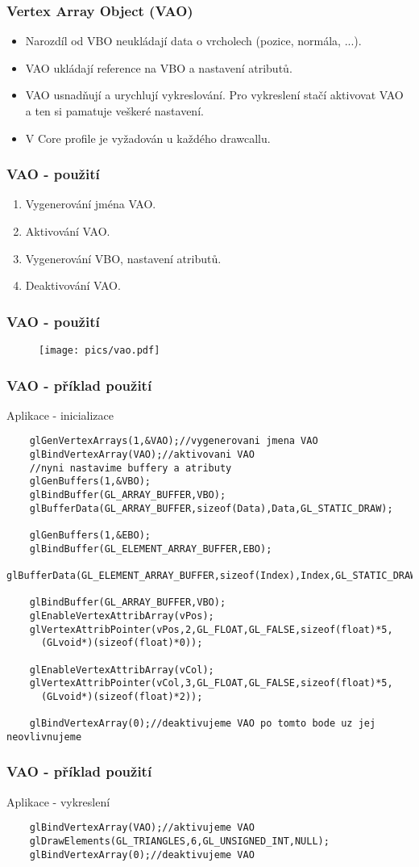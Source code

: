 \begin{frame}[fragile]
\frametitle{Vertex Array Object (VAO)}
	\begin{itemize}
	\item Narozdíl od VBO neukládají data o vrcholech (pozice, normála, ...).
	\item VAO ukládají reference na VBO a nastavení atributů.
	\item VAO usnadňují a urychlují vykreslování.
	Pro vykreslení stačí aktivovat VAO a ten si pamatuje veškeré nastavení.
  \item V Core profile je vyžadován u každého drawcallu.
	\end{itemize}
\end{frame}

\begin{frame}[fragile]
\frametitle{VAO - použití}
	\begin{enumerate}
	\item Vygenerování jména VAO.
	\item Aktivování VAO.
	\item Vygenerování VBO, nastavení atributů.
	\item Deaktivování VAO.
	\end{enumerate}
\end{frame}

\begin{frame}[fragile]
\frametitle{VAO - použití}
  \begin{figure}[h]
  \texttt{[image: pics/vao.pdf]}
  \end{figure}
\end{frame}

\begin{frame}[fragile]
\frametitle{VAO - příklad použití}
	Aplikace - inicializace
	{\scriptsize
	\begin{verbatim}
	glGenVertexArrays(1,&VAO);//vygenerovani jmena VAO
	glBindVertexArray(VAO);//aktivovani VAO
	//nyni nastavime buffery a atributy
	glGenBuffers(1,&VBO);
	glBindBuffer(GL_ARRAY_BUFFER,VBO);
	glBufferData(GL_ARRAY_BUFFER,sizeof(Data),Data,GL_STATIC_DRAW);

	glGenBuffers(1,&EBO);
	glBindBuffer(GL_ELEMENT_ARRAY_BUFFER,EBO);
	glBufferData(GL_ELEMENT_ARRAY_BUFFER,sizeof(Index),Index,GL_STATIC_DRAW);

	glBindBuffer(GL_ARRAY_BUFFER,VBO);
	glEnableVertexAttribArray(vPos);
	glVertexAttribPointer(vPos,2,GL_FLOAT,GL_FALSE,sizeof(float)*5,
	  (GLvoid*)(sizeof(float)*0));

	glEnableVertexAttribArray(vCol);
	glVertexAttribPointer(vCol,3,GL_FLOAT,GL_FALSE,sizeof(float)*5,
	  (GLvoid*)(sizeof(float)*2));

	glBindVertexArray(0);//deaktivujeme VAO po tomto bode uz jej neovlivnujeme
	\end{verbatim}
	}
\end{frame}

\begin{frame}[fragile]
\frametitle{VAO - příklad použití}
	Aplikace - vykreslení
	{\scriptsize
	\begin{verbatim}
	glBindVertexArray(VAO);//aktivujeme VAO
	glDrawElements(GL_TRIANGLES,6,GL_UNSIGNED_INT,NULL);
	glBindVertexArray(0);//deaktivujeme VAO
	\end{verbatim}
	}
\end{frame}

